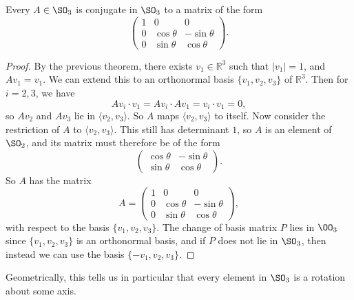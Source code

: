 \documentclass[a4paper]{scrartcl}
\begin{document}
\begin{corollary}
	Every $A \in \SO_3$ is conjugate in $\SO_3$ to a matrix of the form
	$$
	\begin{pmatrix}
		1 & 0 & 0 \\
		0 & \cos \theta & - \sin \theta \\
		0 & \sin \theta & \cos \theta
	\end{pmatrix}.
	$$
\end{corollary}
\begin{proof}
	By the previous theorem, there exists $v_1 \in \mathbb{R}^3$ such that $|v_1| = 1$, and $Av_1 = v_1$. We can extend this to an orthonormal basis $\{v_1, v_2, v_3\}$ of $\mathbb{R}^3$. Then for $i = 2, 3$, we have 
	$$
Av_i \cdot v_1 = A v_i \cdot Av_1 = v_i \cdot v_1 = 0,
	$$
	so $Av_2$ and $Av_3$ lie in $\langle v_2, v_3 \rangle$. So $A$ maps $\langle v_2, v_3 \rangle$ to itself. Now consider the restriction of $A$ to $\langle v_2, v_3 \rangle$. This still has determinant $1$, so $A$ is an element of $\SO_2$, and its matrix must therefore be of the form
	$$
	\begin{pmatrix}
		\cos \theta & - \sin \theta \\
		\sin \theta & \cos \theta
	\end{pmatrix}.
	$$
	So $A$ has the matrix
	$$
A = \begin{pmatrix}
	1 & 0 & 0 \\
	0 & \cos \theta & - \sin \theta \\
	0 & \sin \theta & \cos \theta
\end{pmatrix},
	$$
	with respect to the basis $\{v_1, v_2, v_3\}$. The change of basis matrix $P$ lies in $\OO_3$ since $\{v_1, v_2, v_3\}$ is an orthonormal basis, and if $P$ does not lie in $\SO_3$, then instead we can use the basis $\{-v_1, v_2, v_3\}$.
\end{proof}

Geometrically, this tells us in particular that every element in $\SO_3$ is a rotation about some axis. 
\end{document}

